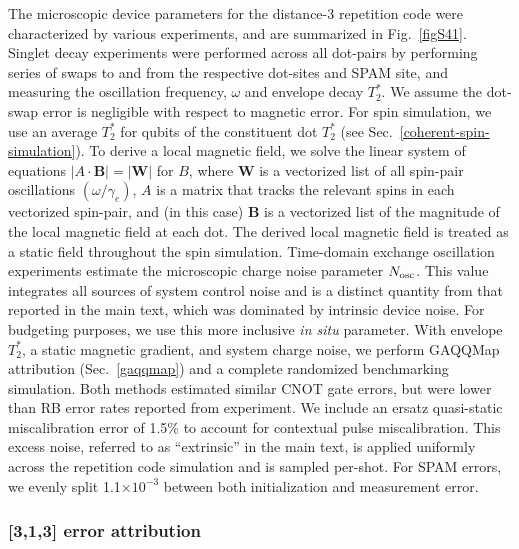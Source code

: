 \documentclass[aps,prl,twocolumn,superscriptaddress,nobibnotes,10pt,floatfix]{revtex4-2}
\newcommand{\e}[1]{\ensuremath{\times 10^{#1}}}
\newcommand{\secref}[1]{Sec.~\ref{#1}}
\newcommand{\figref}[1]{Fig.~\ref{#1}}
\newcommand{\ts}[2]{{#1}_{\textnormal{#2}}}
\newcommand{\Nosc}{\ensuremath{\ts{N}{osc}}}
\begin{document}
The microscopic device parameters for the distance-3 repetition code were characterized by various experiments, and are summarized in \figref{figS41}.
Singlet decay experiments were performed across all dot-pairs by performing series of swaps to and from the respective dot-sites and SPAM site, and measuring the oscillation frequency, \(\omega\) and envelope decay \(T_{2}^{*}\).
We assume the dot-swap error is negligible with respect to magnetic error.
For spin simulation, we use an average \(T_{2}^{*}\) for qubits of the constituent dot \(T_{2}^{*}\) (see \secref{coherent-spin-simulation}).
To derive a local magnetic field, we solve the linear system of equations \(|A\cdot \mathbf{B}| = |\mathbf{W}|\) for \(B\), where \(\mathbf{W}\) is a vectorized list of all spin-pair oscillations $(\omega/\gamma_e)$, \(A\) is a matrix that tracks the relevant spins in each vectorized spin-pair, and (in this case) \(\mathbf{B}\) is a vectorized list of the magnitude of the local magnetic field at each dot.
The derived local magnetic field is treated as a static field throughout the spin simulation.
Time-domain exchange oscillation experiments estimate the microscopic charge noise parameter \(\Nosc\).
This value integrates all sources of system control noise and is a distinct quantity from that reported in the main text, which was dominated by intrinsic device noise.
For budgeting purposes, we use this more inclusive \textit{in situ} parameter.
With envelope \(T_{2}^{*}\), a static magnetic gradient, and system charge noise, we perform GAQQMap attribution (\secref{gaqqmap}) and a complete randomized benchmarking simulation.
Both methods estimated similar CNOT gate errors, but were lower than RB error rates reported from experiment.
We include an ersatz quasi-static miscalibration error of 1.5\% to account for contextual pulse miscalibration.
This excess noise, referred to as ``extrinsic'' in the main text, is applied uniformly across the repetition code simulation and is sampled per-shot.
For SPAM errors, we evenly split 1.1\e{-3} between both initialization and measurement error.

\subsubsection{{[}3,1,3{]} error attribution}\label{error-attribution-313}
\end{document}
